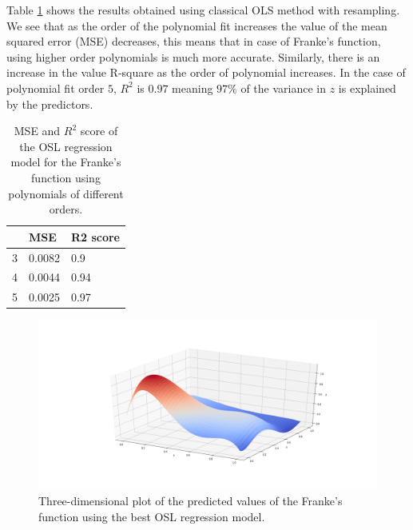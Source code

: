 \documentclass [11pt]{article}
\begin{document}
Table \ref{tab:olsFranke} shows the results obtained using classical OLS method with resampling. We see that as the order of the polynomial fit increases the value of  the mean squared error (MSE) decreases, this means that in case of Franke's function, using higher order polynomials is much more accurate. Similarly, there is an increase in the value R-square as the order of polynomial increases. In the case of polynomial fit order $5$, $R^{2}$ is $0.97$ meaning $97\%$ of the variance in $z$ is explained by the predictors. 

\begin{table}[H]
\centering
\begin{tabular}{lll}
\hline
  & MSE    & R2 score \\ \hline
3 & 0.0082 & 0.9      \\
4 & 0.0044 & 0.94     \\
5 & 0.0025 & 0.97     \\ \hline
\end{tabular}
\caption{MSE and $R^{2}$ score of the OSL regression model for the Franke's function using polynomials of different orders.}
\label{tab:olsFranke}
\end{table}
 
\begin{figure}[H]
\centering
\includegraphics[width=1\textwidth]{figures/olsFranke.png}
        \caption{Three-dimensional plot of the predicted values of the Franke’s function using the best OSL regression model.}
        \label{fig:olsFranke}
\end{figure}
\end{document}
